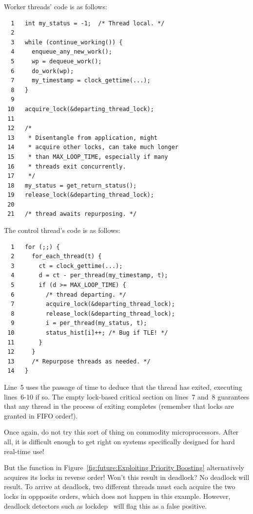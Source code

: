 	Worker threads' code is as follows:

	\vspace{5pt}
	\begin{minipage}[t]{\columnwidth}
	\scriptsize
\begin{verbatim}
  1   int my_status = -1;  /* Thread local. */
  2 
  3   while (continue_working()) {
  4     enqueue_any_new_work();
  5     wp = dequeue_work();
  6     do_work(wp);
  7     my_timestamp = clock_gettime(...);
  8   }
  9 
 10   acquire_lock(&departing_thread_lock);
 11 
 12   /*
 13    * Disentangle from application, might
 14    * acquire other locks, can take much longer
 15    * than MAX_LOOP_TIME, especially if many
 16    * threads exit concurrently.
 17    */
 18   my_status = get_return_status();
 19   release_lock(&departing_thread_lock);
 20 
 21   /* thread awaits repurposing. */
\end{verbatim}
	\end{minipage}
	\vspace{5pt}

	The control thread's code is as follows:

	\vspace{5pt}
	\begin{minipage}[t]{\columnwidth}
	\scriptsize
\begin{verbatim}
  1   for (;;) {
  2     for_each_thread(t) {
  3       ct = clock_gettime(...);
  4       d = ct - per_thread(my_timestamp, t);
  5       if (d >= MAX_LOOP_TIME) {
  6         /* thread departing. */
  7         acquire_lock(&departing_thread_lock);
  8         release_lock(&departing_thread_lock);
  9         i = per_thread(my_status, t);
 10         status_hist[i]++; /* Bug if TLE! */
 11       }
 12     }
 13     /* Repurpose threads as needed. */
 14   }
\end{verbatim}
	\end{minipage}
	\vspace{5pt}

	Line~5 uses the passage of time to deduce that the thread
	has exited, executing lines~6-10 if so.
	The empty lock-based critical section on lines~7 and~8
	guarantees that any thread in the process of exiting
	completes (remember that locks are granted in FIFO order!).

	Once again, do not try this sort of thing on commodity
	microprocessors.
	After all, it is difficult enough to get right on systems
	specifically designed for hard real-time use!

\QuickQ{}
	But the  function in
	Figure~\ref{fig:future:Exploiting Priority Boosting}
	alternatively acquires its locks in reverse order!
	Won't this result in deadlock?
\QuickA{}
	No deadlock will result.
	To arrive at deadlock, two different threads must each
	acquire the two locks in oppposite orders, which does not
	happen in this example.
	However, deadlock detectors such as
	lockdep~\cite{JonathanCorbet2006lockdep}
	will flag this as a false positive.

